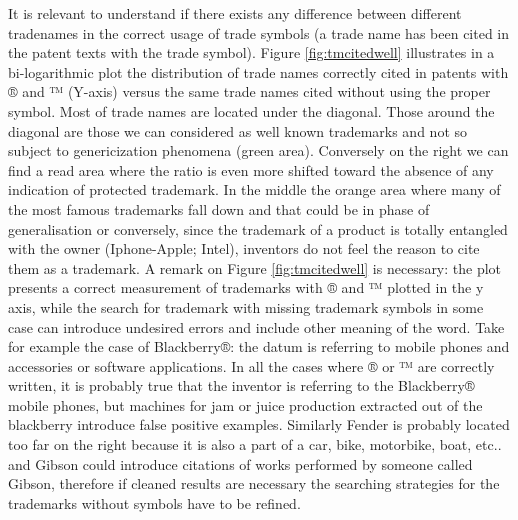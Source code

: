 \documentclass[]{book}
\theoremstyle{definition}
\theoremstyle{definition}
\theoremstyle{definition}
\theoremstyle{remark}
\begin{document}
It is relevant to understand if there exists any difference between
different tradenames in the correct usage of trade symbols (a trade name
has been cited in the patent texts with the trade symbol). Figure
\ref{fig:tmcitedwell} illustrates in a bi-logarithmic plot the
distribution of trade names correctly cited in patents with ® and ™
(Y-axis) versus the same trade names cited without using the proper
symbol. Most of trade names are located under the diagonal. Those around
the diagonal are those we can considered as well known trademarks and
not so subject to genericization phenomena (green area). Conversely on
the right we can find a read area where the ratio is even more shifted
toward the absence of any indication of protected trademark. In the
middle the orange area where many of the most famous trademarks fall
down and that could be in phase of generalisation or conversely, since
the trademark of a product is totally entangled with the owner
(Iphone-Apple; Intel), inventors do not feel the reason to cite them as
a trademark. A remark on Figure \ref{fig:tmcitedwell} is necessary: the
plot presents a correct measurement of trademarks with ® and ™ plotted
in the y axis, while the search for trademark with missing trademark
symbols in some case can introduce undesired errors and include other
meaning of the word. Take for example the case of Blackberry®: the datum
is referring to mobile phones and accessories or software applications.
In all the cases where ® or ™ are correctly written, it is probably true
that the inventor is referring to the Blackberry® mobile phones, but
machines for jam or juice production extracted out of the blackberry
introduce false positive examples. Similarly Fender is probably located
too far on the right because it is also a part of a car, bike,
motorbike, boat, etc.. and Gibson could introduce citations of works
performed by someone called Gibson, therefore if cleaned results are
necessary the searching strategies for the trademarks without symbols
have to be refined.
\end{document}
